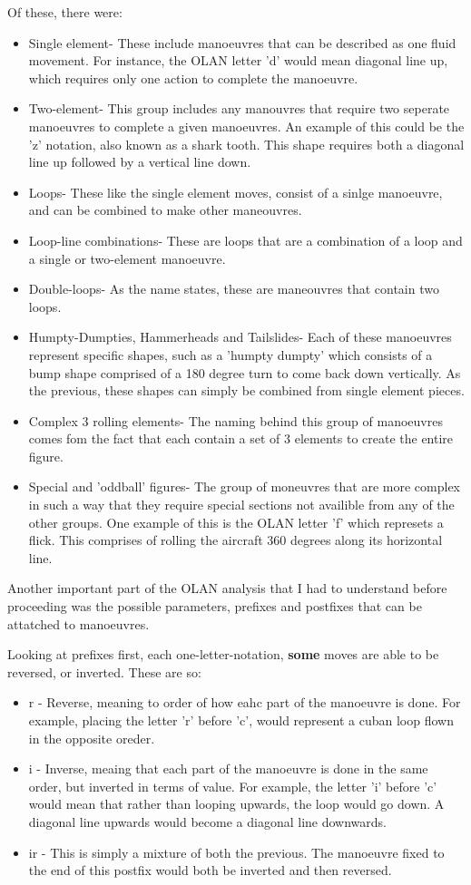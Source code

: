 Of these, there were:
\begin{itemize}
	\item Single element- These include manoeuvres that can be described as one fluid movement. For instance, the OLAN letter 'd' would mean diagonal line up, which requires only one action to complete the manoeuvre.
	\item Two-element- This group includes any manouvres that require two seperate manoeuvres to complete a given manoeuvres. An example of this could be the 'z' notation, also known as a shark tooth. This shape requires both a diagonal line up followed by a vertical line down. 
	\item Loops- These like the single element moves, consist of a sinlge manoeuvre, and can be combined to make other maneouvres.
	\item Loop-line combinations- These are loops that are a combination of a loop and a single or two-element manoeuvre.
	\item Double-loops- As the name states, these are maneouvres that contain two loops.
	\item Humpty-Dumpties, Hammerheads and Tailslides- Each of these manoeuvres represent specific shapes, such as a 'humpty dumpty' which consists of a bump shape comprised of a 180 degree turn to come back down vertically. As the previous, these shapes can simply be combined from single element pieces. 
	\item Complex 3 rolling elements- The naming behind this group of manoeuvres comes fom the fact that each contain a set of 3 elements to create the entire figure.
	\item Special and 'oddball' figures- The group of moneuvres that are more complex in such a way that they require special sections not availible from any of the other groups. One example of this is the OLAN letter 'f' which represets a flick. This comprises of rolling the aircraft 360 degrees along its horizontal line.
\end{itemize}

Another important part of the OLAN analysis that I had to understand before proceeding was the possible parameters, prefixes and postfixes that can be attatched to manoeuvres. 

Looking at prefixes first, each one-letter-notation, \textbf{some} moves are able to be reversed, or inverted. These are so:
\begin{itemize}
	\item r - Reverse, meaning to order of how eahc part of the manoeuvre is done. For example, placing the letter 'r' before 'c', would represent a cuban loop flown in the opposite oreder. 
	\item i - Inverse, meaing that each part of the manoeuvre is done in the same order, but inverted in terms of value. For example, the letter 'i' before 'c' would mean that rather than looping upwards, the loop would go down. A diagonal line upwards would become a diagonal line downwards.
	\item ir - This is simply a mixture of both the previous. The manoeuvre fixed to the end of this postfix would both be inverted and then reversed. 
\end{itemize}

